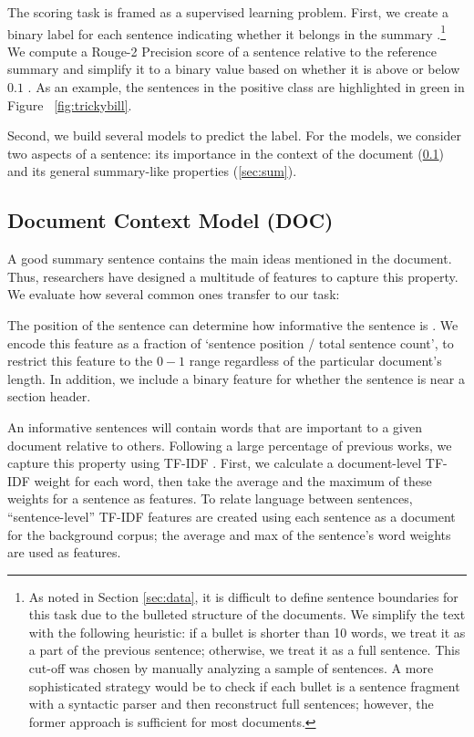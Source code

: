 \documentclass[11pt,a4paper]{article}
\begin{document}
The scoring task is framed as a supervised learning problem. First, we create a binary label for each sentence indicating whether it belongs in the summary \cite{gillick2008icsi}.\footnote{As noted in Section \ref{sec:data}, it is difficult to define sentence boundaries for this task due to the bulleted structure of the documents. We simplify the text with the following heuristic: if a bullet is shorter than 10 words, we treat it as a part of the previous sentence; otherwise, we treat it as a full sentence. This cut-off was chosen by manually analyzing a sample of sentences. A more sophisticated strategy would be to check if each bullet is a sentence fragment with a syntactic parser and then reconstruct full sentences; however, the former approach is sufficient for most documents.} 
We compute a Rouge-2 Precision score of a sentence relative to the reference summary and simplify it to a binary value based on whether it is above or below $0.1$ \cite{lin2004rouge, zopfsentregression}. As an example, the sentences in the positive class are highlighted in green in Figure ~\ref{fig:trickybill}. 



Second, we build several models to predict the label. For the models, we consider two aspects of a sentence: its importance in the context of the document (\ref{sec:doc}) and its general summary-like properties (\ref{sec:sum}). 

\subsection{Document Context Model (DOC)}
\label{sec:doc}
A good summary sentence contains the main ideas mentioned in the document. Thus, researchers have designed a multitude of features to capture this property. We evaluate how several common ones transfer to our task:

The position of the sentence can determine how informative the sentence is \cite{seki2002tfidf}. 
We encode this feature as a fraction of `sentence position / total sentence count', to restrict this feature to the $0-1$ range regardless of the particular document's length. In addition, we include a binary feature for whether the sentence is near a section header.

An informative sentences will contain words that are important to a given document relative to others. Following a large percentage of previous works, we capture this property using TF-IDF \cite{seki2002tfidf, ramos2003tfidf}. First, we calculate a document-level TF-IDF weight for each word, then take the average and the maximum of these weights for a sentence as features. To relate language between sentences, ``sentence-level'' TF-IDF features are created using each sentence as a document for the background corpus; the average and max of the sentence's word weights are used as features.
\end{document}
